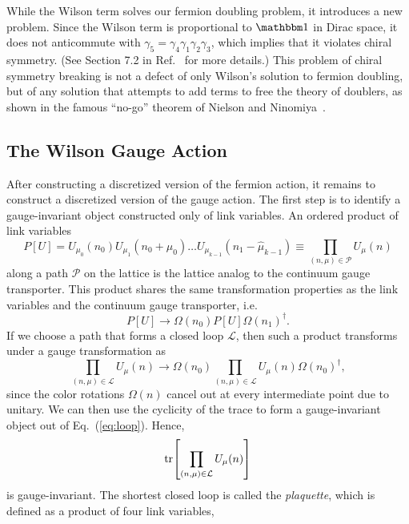 While the Wilson term solves our fermion doubling problem, it introduces a new problem. Since the Wilson term is proportional to $\mathbbm 1$ in Dirac space, it does not anticommute with $\gamma_5 = \gamma_4 \gamma_1 \gamma_2 \gamma_3$, which implies that it violates chiral symmetry. (See Section 7.2 in Ref.~\cite{Gattringer:2010zz} for more details.) This problem of chiral symmetry breaking is not a defect of only Wilson's solution to fermion doubling, but of any solution that attempts to add terms to free the theory of doublers, as shown in the famous ``no-go'' theorem of Nielson and Ninomiya~\cite{Nielsen:1981hk}.
\subsection{The Wilson Gauge Action}
After constructing a discretized version of the fermion action, it remains to construct a discretized version of the gauge action. The first step is to identify a gauge-invariant object constructed only of link variables. An ordered product of link variables
\begin{equation}
    P[U]=U_{\mu_{0}}\left(n_{0}\right) U_{\mu_{1}}\left(n_{0}+\hat{\mu}_{0}\right) \ldots U_{\mu_{k-1}}\left(n_{1}-\hat{\mu}_{k-1}\right) \equiv \prod_{(n, \mu) \in \mathcal{P}} U_{\mu}(n)
\end{equation}
along a path $\mathcal P$ on the lattice is the lattice analog to the continuum gauge transporter. This product shares the same transformation properties as the link variables and the continuum gauge transporter, i.e.
\begin{equation}
    P[U] \rightarrow \Omega\left(n_{0}\right) P[U] \Omega\left(n_{1}\right)^{\dagger}.
\end{equation}
If we choose a path that forms a closed loop $\mathcal L$, then such a product transforms under a gauge transformation as
\begin{equation}\label{eq:loop}
    \prod_{(n, \mu) \in \mathcal{L}} U_{\mu}(n) \rightarrow \Omega\left(n_{0}\right) \prod_{(n, \mu) \in \mathcal{L}} U_{\mu}(n) \Omega\left(n_{0}\right)^{\dagger},
\end{equation}
since the color rotations $\Omega(n)$ cancel out at every intermediate point due to unitary. We can then use the cyclicity of the trace to form a gauge-invariant object out of Eq.~(\ref{eq:loop}). Hence,
\begin{equation}
    \tr[\prod_{(n, \mu) \in \mathcal{L}} U_{\mu}(n)]
\end{equation}
is gauge-invariant. The shortest closed loop is called the \emph{plaquette}, which is defined as a product of four link variables,
